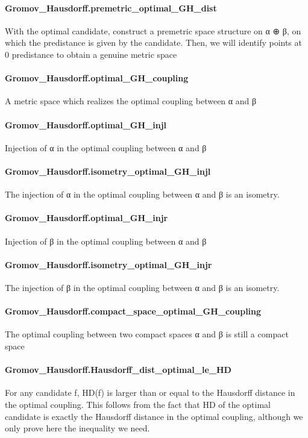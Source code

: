 \documentclass{article}
\begin{document}
\paragraph{Gromov\_Hausdorff.premetric\_optimal\_GH\_dist}
\par
With the optimal candidate, construct a premetric space structure on α ⊕ β, on which the
predistance is given by the candidate. Then, we will identify points at 0 predistance
to obtain a genuine metric space
\paragraph{Gromov\_Hausdorff.optimal\_GH\_coupling}
\par
A metric space which realizes the optimal coupling between α and β
\paragraph{Gromov\_Hausdorff.optimal\_GH\_injl}
\par
Injection of α in the optimal coupling between α and β
\paragraph{Gromov\_Hausdorff.isometry\_optimal\_GH\_injl}
\par
The injection of α in the optimal coupling between α and β is an isometry.
\paragraph{Gromov\_Hausdorff.optimal\_GH\_injr}
\par
Injection of β  in the optimal coupling between α and β
\paragraph{Gromov\_Hausdorff.isometry\_optimal\_GH\_injr}
\par
The injection of β in the optimal coupling between α and β is an isometry.
\paragraph{Gromov\_Hausdorff.compact\_space\_optimal\_GH\_coupling}
\par
The optimal coupling between two compact spaces α and β is still a compact space
\paragraph{Gromov\_Hausdorff.Hausdorff\_dist\_optimal\_le\_HD}
\par
For any candidate f, HD(f) is larger than or equal to the Hausdorff distance in the
optimal coupling. This follows from the fact that HD of the optimal candidate is exactly
the Hausdorff distance in the optimal coupling, although we only prove here the inequality
we need.
\end{document}

